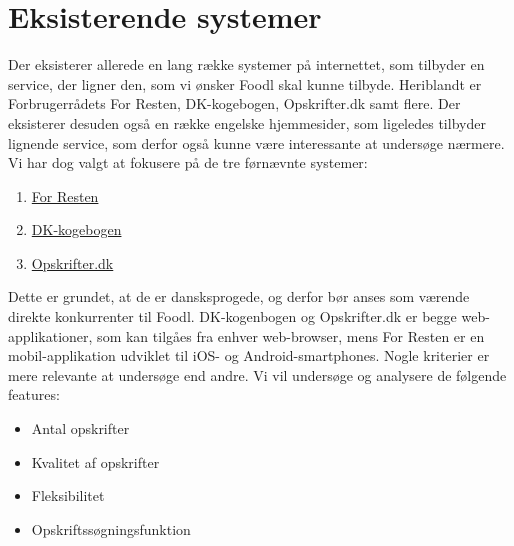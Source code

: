 \section{Eksisterende systemer}
Der eksisterer allerede en lang række systemer på internettet, som tilbyder en service, der ligner den, som vi ønsker Foodl skal kunne tilbyde. Heriblandt er Forbrugerrådets For Resten, DK-kogebogen, Opskrifter.dk samt flere. Der eksisterer desuden også en række engelske hjemmesider, som ligeledes tilbyder lignende service, som derfor også kunne være interessante at undersøge nærmere. Vi har dog valgt at fokusere på de tre førnævnte systemer: 

\begin{enumerate}[noitemsep]
  \item \href{https://play.google.com/store/apps/details?id=com.nodes.forresten}{For Resten} \cite{forresten}
  \item \href{http://www.dk-kogebogen.dk/}{DK-kogebogen} \cite{dkkogebogen}
  \item \href{http://opskrifter.dk/}{Opskrifter.dk} \cite{opskrifterdk}
\end{enumerate}

Dette er grundet, at de er dansksprogede, og derfor bør anses som værende direkte konkurrenter til Foodl. DK-kogenbogen og Opskrifter.dk er begge web-applikationer, som kan tilgåes fra enhver web-browser, mens For Resten er en mobil-applikation udviklet til iOS- og Android-smartphones. Nogle kriterier er mere relevante at undersøge end andre. Vi vil undersøge og analysere de følgende features:

\begin{itemize}[noitemsep]
  \item Antal opskrifter
  \item Kvalitet af opskrifter
  \item Fleksibilitet
  \item Opskriftssøgningsfunktion
\end{itemize}

